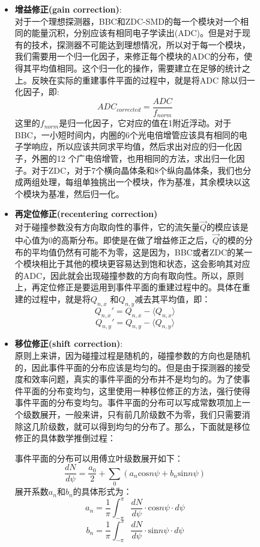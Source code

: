 \begin{figure}[htbp]
\begin{itemize}
\item \textbf{增益修正(gain correction)}: \\
对于一个理想探测器，BBC和ZDC-SMD的每一个模块对一个相同的能量沉积，分别应该有相同电子学读出(ADC)。但是对于现有的技术，探测器不可能达到理想情况，所以对于每一个模块，我们需要用一个归一化因子，来修正每个模块的ADC的分布，使得其平均值相同。这个归一化的操作，需要建立在足够的统计之上。反映在实际的重建事件平面的过程中，就是将ADC 除以归一化因子，即:
\begin{equation}
ADC_{corrected} = \frac{ADC}{f_{norm}}
\end{equation}
这里的$f_{norm}$是归一化因子，它对应的值在1附近浮动。对于BBC，一小短时间内，内圈的6个光电倍增管应该具有相同的电子学响应，所以应该共同求平均值，然后求出对应的归一化因子，外圈的12 个广电倍增管，也用相同的方法，求出归一化因子。对于ZDC，对于7个横向晶体条和8个纵向晶体条，我们也分成两组处理，每组单独挑出一个模块，作为基准，其余模块以这个模块为基准，然后归一化。

\item \textbf{再定位修正(recentering correction)} \\
对于碰撞参数没有方向取向性的事件，它的流矢量$\vec{Q}$的模应该是中心值为0的高斯分布。即使是在做了增益修正之后，$\vec{Q}$的模的分布的平均值仍然有可能不为零，这是因为，BBC或者ZDC的某一个模块相比于其他的模块更容易达到饱和状态，这会影响其对应的ADC，因此就会出现碰撞参数的方向有取向性。所以，原则上，再定位修正是要运用到事件平面的重建过程中的。具体在重建的过程中，就是将$Q_{n,x}$ 和$Q_{n,y}$减去其平均值，即：
\begin{equation}
Q_{n,x}\prime = Q_{n,x} - \langle Q_{n,x} \rangle
\end{equation}
\begin{equation}
Q_{n,y}\prime = Q_{n,y} - \langle Q_{n,y} \rangle
\end{equation}

\item \textbf{移位修正(shift correction)}: \\
原则上来讲，因为碰撞过程是随机的，碰撞参数的方向也是随机的，因此事件平面的分布应该是均匀的。但是由于探测器的接受度和效率问题，真实的事件平面的分布并不是均匀的。为了使事件平面的分布变均匀，这里使用一种移位修正的方法，强行使得事件平面的分布变均匀。事件平面的分布可以写成常数项加上一个级数展开，一般来讲，只有前几阶级数不为零，我们只需要消除这几阶级数，就可以得到均匀的分布了。那么，下面就是移位修正的具体数学推倒过程：

事件平面的分布可以用傅立叶级数展开如下：
\begin{equation}
\frac{dN}{d\psi} = \frac{a_{0}}{2} + \sum_{0}(a_{n}\mathrm{cos}n\psi + b_{n}\mathrm{sin}n\psi)
\label{eq:dN_dPsi_1}
\end{equation}
展开系数$a_{n}$和$b_{n}$的具体形式为：
\begin{equation}
a_{n} = \frac{1}{\pi} \int^{\pi}_{-\pi} \frac{dN}{d\psi}\cdot \mathrm{cos}n\psi \cdot d\psi
\end{equation}
\begin{equation}
b_{n} = \frac{1}{\pi} \int^{\pi}_{-\pi} \frac{dN}{d\psi}\cdot \mathrm{sin}n\psi \cdot d\psi
\end{equation}


\end{itemize}
\end{figure}
